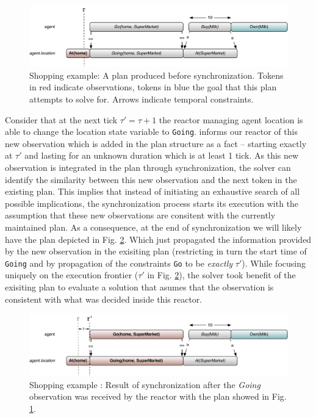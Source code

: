 \begin{figure}[!htb]
  \centering
  \includegraphics[width=0.7\columnwidth]{figs/shoping_exec_t0}
  \caption{\small Shopping example: A plan produced before
    synchronization.  Tokens in red indicate observations, tokens in
    blue the goal that this plan attempts to solve for. Arrows
    indicate temporal constraints.}
  \label{fig:shop:exec0}
\end{figure}

Consider that at the next tick $\tau' = \tau+1$ the reactor managing
agent location is able to change the location state variable to
\texttt{Going}. \rx informs our reactor of this new observation which
is added in the plan structure as a fact -- starting exactly at
$\tau'$ and lasting for an unknown duration which is at least 1
tick. As this new observation is integrated in the plan through
synchronization, the solver can identify the similarity between this
new observation and the next token in the existing plan. This implies
that instead of initiating an exhaustive search of all possible
implications, the synchronization process starts its execution with
the assumption that these new observations are consitent with the
currently maintained plan. As a consequence, at the end of
synchronization we will likely have the plan depicted in
Fig. \ref{fig:shop:exec1}. Which just propagated the information
provided by the new observation in the exisiting plan (restricting in
turn the start time of \texttt{Going} and by propagation of the
constraints \texttt{Go} to be {\em exactly} $\tau'$). While focusing
uniquely on the execution frontier ($\tau'$ in
Fig. \ref{fig:shop:exec1}), the \eu solver took benefit of the
exisiting plan to evaluate a solution that asumes that the observation
is consistent with what was decided inside this reactor.

\begin{figure}[!htb]
  \centering
  \includegraphics[width=0.7\columnwidth]{figs/shoping_exec_t1}
  \caption{Shopping example : Result of synchronization after the {\em
      Going} observation was received by the reactor with the plan
    showed in Fig. \ref{fig:shop:exec0}.}
  \label{fig:shop:exec1}
\end{figure}

